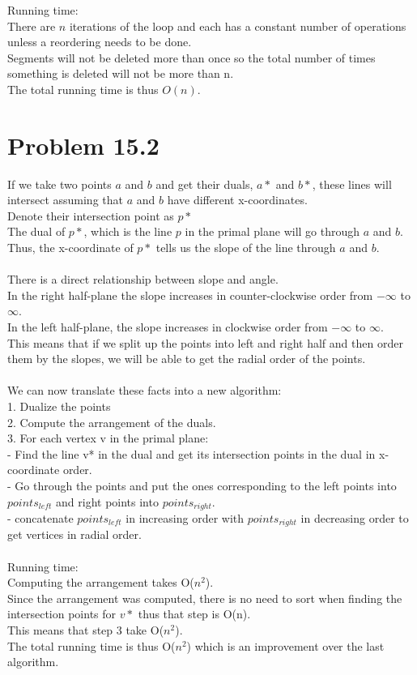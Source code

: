 \documentclass[11pt,psfig]{article}
\begin{document}
Running time:\\
There are $n$ iterations of the loop and each has a constant number of operations unless a reordering needs to be done. \\
Segments will not be deleted more than once so the total number of times something is deleted will not be more than n. \\
The total running time is thus $O(n)$. 



\newpage

\section*{Problem 15.2}

If we take two points $a$ and $b$ and get their duals, $a*$ and $b*$, these lines will intersect assuming that $a$ and $b$ have different x-coordinates. \\
Denote their intersection point as $p*$\\
The dual of $p*$, which is the line $p$ in the primal plane will go through $a$ and $b$. \\
Thus, the x-coordinate of $p*$ tells us the slope of the line through $a$ and $b$. \\
\\
There is a direct relationship between slope and angle. \\
In the right half-plane the slope increases in counter-clockwise order from $-\infty$ to $\infty$. \\
In the left half-plane, the slope increases in clockwise order from $-\infty$ to $\infty$. \\
This means that if we split up the points into left and right half and then order them by the slopes, we will be able to get the radial order of the points. \\
\\
We can now translate these facts into a new algorithm:\\
1. Dualize the points\\
2. Compute the arrangement of the duals. \\
3. For each vertex v in the primal plane:\\
- Find the line v* in the dual and get its intersection points in the dual in x-coordinate order. \\
- Go through the points and put the ones corresponding to the left points into $points_{left}$ and right points into $points_{right}$. \\
- concatenate $points_{left}$ in increasing order with $points_{right}$ in decreasing order to get vertices in radial order. \\
\\
Running time:\\
Computing the arrangement takes O($n^2$). \\
Since the arrangement was computed, there is no need to sort when finding the intersection points for $v*$ thus that step is O(n). \\
This means that step 3 take O($n^2$). \\
The total running time is thus O($n^2$) which is an improvement over the last algorithm. 
\end{document}
